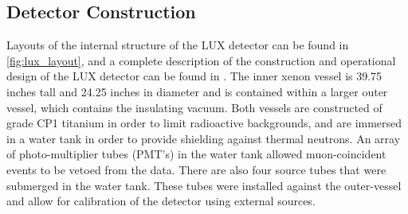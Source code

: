 \subsection{Detector Construction}
Layouts of the internal structure of the LUX detector can be found in \ref{fig:lux_layout}, and a complete description of the construction and operational design of the LUX detector can be found in \cite{lux2012}. The inner xenon vessel is 39.75 inches tall and 24.25 inches in diameter and is contained within a larger outer vessel, which contains the insulating vacuum. Both vessels are constructed of grade CP1 titanium in order to limit radioactive backgrounds, and are immersed in a water tank in order to provide shielding against thermal neutrons. An array of photo-multiplier tubes (PMT's) in the water tank allowed muon-coincident events to be vetoed from the data. There are also four source tubes that were submerged in the water tank. These tubes were installed against the outer-vessel and allow for calibration of the detector using external sources.
